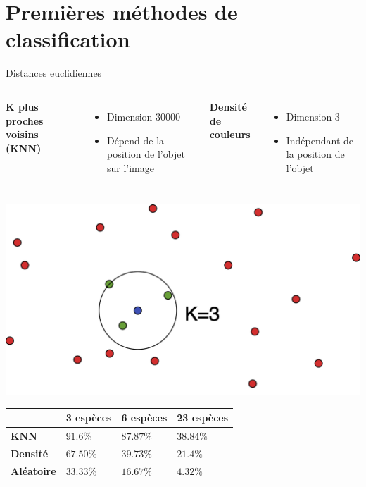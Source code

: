 \documentclass[10pt,xcolor={x11names}]{beamer}
\newcommand{\sectitle}[1]{{\large\color{titleblue}\textbf{#1}\\\smallskip}}
\begin{document}
\section{Premières méthodes de classification}

\begin{frame}{Distances euclidiennes}
	\begin{columns}[T]
		\sectitle{K plus proches voisins (KNN)}
		\begin{itemize}
			\item Dimension $30 000$
			\item Dépend de la position de l'objet sur l'image
		\end{itemize}
		
		\sectitle{Densité de couleurs}
		\begin{itemize}
			\item Dimension $3$
			\item Indépendant de la position de l'objet
		\end{itemize}
	\end{columns}
	
	\begin{center}
		\includegraphics[width=.4\textwidth]{KNN.png}
		
		\begin{tabular}{ |m{6.5em}|m{6.5em}|m{6.5em}|m{6.5em}| }
			\hline
			& \textbf{3 espèces} & \textbf{6 espèces} &  \textbf{23 espèces} \\
			\hline\smallskip
			\textbf{KNN} & $91.6\%$ & $87.87\%$ & $38.84\%$ \\\smallskip
			\textbf{Densité} & $67.50\%$ & $39.73\%$ & $21.4\%$ \\\smallskip
			\textbf{Aléatoire} & $33.33\%$ & $16.67\%$ & $4.32\%$ \\
			\hline
		\end{tabular}
	\end{center}
	
\end{frame}
\end{document}
